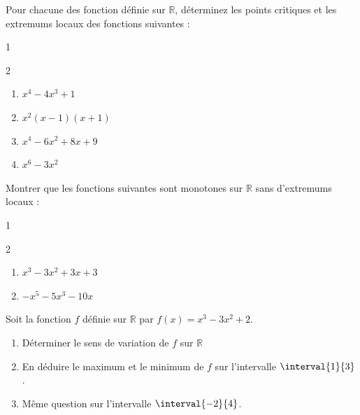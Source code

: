 \documentclass[main.tex]{subfiles}
\begin{document}
\newpage 
\begin{exercise}  \label{chapter06:exercice:derivation:operation07}
Pour chacune des  fonction définie sur $\mathbb{R}$, déterminez les points critiques et  les extremums locaux des fonctions suivantes :
	\vspace{-1em}
	\begin{multicols}{1}
	\begin{spacing}{2} 
		\begin{enumerate}[label={\arabic*)$f(x)=$}, leftmargin=*]
		\item $x^4-4x^3+1$
		\item $x^2(x-1)(x+1)$
		\item $x^4-6x^2+8x+9$
		\item $x^6-3x^2$
		\end{enumerate} 
	\end{spacing}
\end{multicols}  
\end{exercise} \vspace{-0.5em}
\begin{exercise}  \label{chapter06:exercice:derivation:operation08}
Montrer que les fonctions suivantes sont monotones sur $\mathbb{R}$ sans d'extremums locaux :
	\vspace{-1em}
	\begin{multicols}{1}
		\begin{spacing}{2} 
			\begin{enumerate}[label={\arabic*)$f(x)=$}, leftmargin=*]
				\item $x^3-3x^2+3x+3$
				\item $-x^5-5x^3-10x$ 
			\end{enumerate} 
		\end{spacing}
	\end{multicols}   
\end{exercise}\vspace{-0.5em}
\begin{exercise} 
	Soit la fonction $f$ définie sur $\mathbb{R}$ par $f(x)=x^3-3x^2+2$.
	\begin{enumerate}[leftmargin=*,label=\arabic*)]
		\item Déterminer le sens de variation de $f$ sur $\mathbb{R}$
		\item En déduire le maximum et le minimum de $f$ sur l'intervalle $\interval{1}{3}$.
		\item Même question sur l'intervalle $\interval{-2}{4}$.
	\end{enumerate}
\end{exercise}
\end{document}
